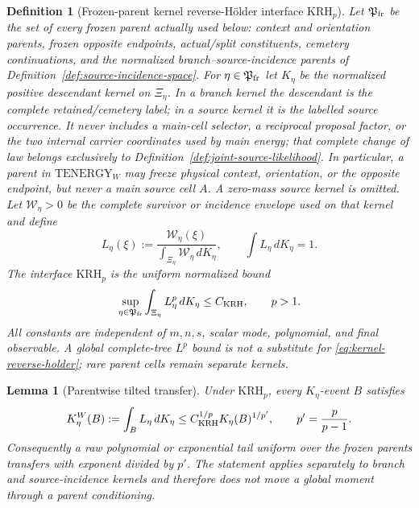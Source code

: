\documentclass[11pt]{article}
\newtheorem{lemma}[theorem]{Lemma}
\newtheorem{definition}[theorem]{Definition}
\begin{document}
\begin{definition}[Frozen-parent kernel reverse-H\"older interface
$\mathrm{KRH}_{p}$]
\label{def:kernel-reverse-holder}
Let $\mathfrak P_{\rm fr}$ be the set of every frozen parent actually used
below: context and orientation parents, frozen opposite endpoints,
actual/split constituents, cemetery continuations, and the normalized
branch--source-incidence parents of
Definition~\ref{def:source-incidence-space}.  For
$\eta\in\mathfrak P_{\rm fr}$ let $K_\eta$ be the normalized positive
descendant kernel on $\Xi_\eta$.  In a branch kernel the descendant is the
complete retained/cemetery label; in a source kernel it is the labelled
source occurrence.  It never includes a main-cell selector, a reciprocal
proposal factor, or the two internal carrier coordinates used by main
energy; that complete change of law belongs exclusively to
Definition~\ref{def:joint-source-likelihood}.  In particular, a parent in
$\mathrm{TENERGY}_{W}$ may freeze physical context, orientation, or the
opposite endpoint, but never a main source cell $A$.  A zero-mass source
kernel is omitted.  Let
$\mathscr W_\eta>0$ be the complete survivor or incidence envelope used on
that kernel and define
\begin{equation}
\label{eq:kernel-normalized-likelihood}
 L_\eta(\xi):=
 \frac{\mathscr W_\eta(\xi)}
      {\int_{\Xi_\eta}\mathscr W_\eta\,dK_\eta},
 \qquad \int L_\eta\,dK_\eta=1.
\end{equation}
The interface $\mathrm{KRH}_{p}$ is the uniform normalized bound
\begin{equation}
\label{eq:kernel-reverse-holder}
 \sup_{\eta\in\mathfrak P_{\rm fr}}
 \int_{\Xi_\eta}L_\eta^p\,dK_\eta\le C_{\rm KRH},
 \qquad p>1.
\end{equation}
All constants are independent of $m,n,s$, scalar mode, polynomial, and final
observable.  A global complete-tree $L^p$ bound is not a substitute for
\eqref{eq:kernel-reverse-holder}; rare parent cells remain separate kernels.
\end{definition}

\begin{lemma}[Parentwise tilted transfer]
\label{lem:parentwise-holder-transfer}
Under $\mathrm{KRH}_{p}$, every $K_\eta$-event $B$ satisfies
\begin{equation}
\label{eq:parentwise-holder-transfer}
 K_\eta^{W}(B):=\int_B L_\eta\,dK_\eta
 \le C_{\rm KRH}^{1/p}K_\eta(B)^{1/p'},
 \qquad p'=\frac p{p-1}.
\end{equation}
Consequently a raw polynomial or exponential tail uniform over the frozen
parents transfers with exponent divided by $p'$.  The statement applies
separately to branch and source-incidence kernels and therefore does not move
a global moment through a parent conditioning.
\end{lemma}
\end{document}

